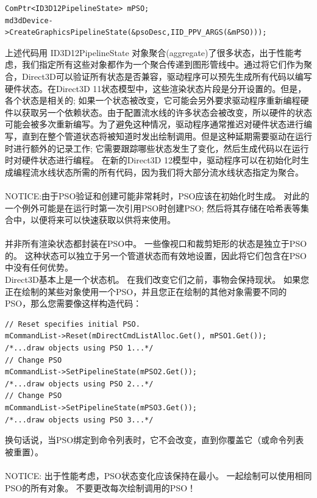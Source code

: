 \documentclass[11pt,a4paper,oldfontcommands]{memoir}
\begin{document}
{\begin{flushleft}
\begin{lstlisting}
ComPtr<ID3D12PipelineState> mPSO;
md3dDevice->CreateGraphicsPipelineState(&psoDesc,IID_PPV_ARGS(&mPSO)));
\end{lstlisting}
上述代码用 ID3D12PipelineState 对象聚合(aggregate)了很多状态，出于性能考虑，我们指定所有这些对象都作为一个聚合传递到图形管线中。通过将它们作为聚合，Direct3D可以验证所有状态是否兼容，驱动程序可以预先生成所有代码以编写硬件状态。在Direct3D 11状态模型中，这些渲染状态片段是分开设置的。但是，各个状态是相关的; 如果一个状态被改变，它可能会另外要求驱动程序重新编程硬件以获取另一个依赖状态。由于配置流水线的许多状态会被改变，所以硬件的状态可能会被多次重新编写。为了避免这种情况，驱动程序通常推迟对硬件状态进行编写，直到在整个管道状态将被知道时发出绘制调用。但是这种延期需要驱动在运行时进行额外的记录工作; 它需要跟踪哪些状态发生了变化，然后生成代码以在运行时对硬件状态进行编程。 在新的Direct3D 12模型中，驱动程序可以在初始化时生成编程流水线状态所需的所有代码，因为我们将大部分流水线状态指定为聚合。\\
~\\
NOTICE:由于PSO验证和创建可能非常耗时，PSO应该在初始化时生成。 对此的一个例外可能是在运行时第一次引用PSO时创建PSO; 然后将其存储在哈希表等集合中，以便将来可以快速获取以供将来使用。\\
~\\
并非所有渲染状态都封装在PSO中。 一些像视口和裁剪矩形的状态是独立于PSO的。 这种状态可以独立于另一个管道状态而有效地设置，因此将它们包含在PSO中没有任何优势。\\
Direct3D基本上是一个状态机。 在我们改变它们之前，事物会保持现状。 如果您正在绘制的某些对象使用一个PSO，并且您正在绘制的其他对象需要不同的PSO，那么您需要像这样构造代码：\\
\begin{lstlisting}
// Reset specifies initial PSO.
mCommandList->Reset(mDirectCmdListAlloc.Get(), mPSO1.Get());
/*...draw objects using PSO 1...*/
// Change PSO
mCommandList->SetPipelineState(mPSO2.Get());
/*...draw objects using PSO 2...*/
// Change PSO
mCommandList->SetPipelineState(mPSO3.Get());
/*...draw objects using PSO 3...*/
\end{lstlisting}
换句话说，当PSO绑定到命令列表时，它不会改变，直到你覆盖它（或命令列表被重置）。\\
~\\
NOTICE: 出于性能考虑，PSO状态变化应该保持在最小。 一起绘制可以使用相同PSO的所有对象。 不要更改每次绘制调用的PSO！
\end{flushleft}

}
\end{document}
